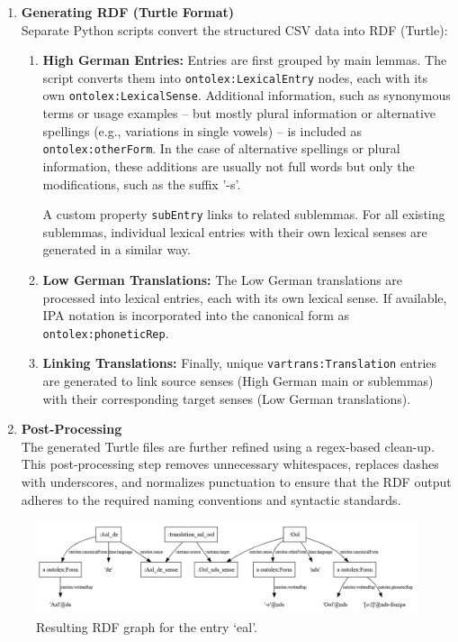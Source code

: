 \begin{enumerate}
    \item {\textbf{Generating RDF (Turtle Format)}}\\ 
    Separate Python scripts convert the structured CSV data into RDF (Turtle):
    \begin{enumerate}
        \item {\textbf{High German Entries:}} Entries are first grouped by main lemmas. The script converts them into \texttt{ontolex:LexicalEntry} nodes, each with its own \texttt{ontolex:LexicalSense}. Additional information, such as synonymous terms or usage examples -- but mostly plural information or alternative spellings (e.g., variations in single vowels) -- is included as \texttt{ontolex:otherForm}. In the case of alternative spellings or plural information, these additions are usually not full words but only the modifications, such as the suffix '-s'. 
        
        A custom property \texttt{subEntry} links to related sublemmas. For all existing sublemmas, individual lexical entries with their own lexical senses are generated in a similar way.
        \item {\textbf{Low German Translations:}} The Low German translations are processed into lexical entries, each with its own lexical sense. If available, IPA notation is incorporated into the canonical form as \texttt{ontolex:phoneticRep}.
        \item {\textbf{Linking Translations:}} Finally, unique \texttt{vartrans:Translation} entries are generated to link source senses (High German main or sublemmas) with their corresponding target senses (Low German translations).
    \end{enumerate}

    \item {\textbf{Post-Processing}}\\  
    The generated Turtle files are further refined using a regex-based clean-up. This post-processing step removes unnecessary whitespaces, replaces dashes with underscores, and normalizes punctuation to ensure that the RDF output adheres to the required naming conventions and syntactic standards.
\end{enumerate}

\begin{figure}
    \centering
    \includegraphics[width=1.0\linewidth]{aal-rdf-graph.png}
    \caption{Resulting RDF graph for the entry  `eal'.}
    \label{fig:aal-graph}
\end{figure}

